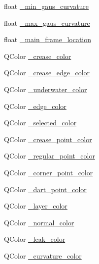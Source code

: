 \begin{DoxyCompactItemize}
\item 
float \hyperlink{classShipCAD_1_1SubdivisionSurface_ac343c30f7e4e6a5926fdfed7da3f9385}{\-\_\-min\-\_\-gaus\-\_\-curvature}
\item 
float \hyperlink{classShipCAD_1_1SubdivisionSurface_a1658374385131656d359ff373d2cb08c}{\-\_\-max\-\_\-gaus\-\_\-curvature}
\item 
float \hyperlink{classShipCAD_1_1SubdivisionSurface_a3ea08aa45ad221a1b485010ce5e8dee7}{\-\_\-main\-\_\-frame\-\_\-location}
\item 
Q\-Color \hyperlink{classShipCAD_1_1SubdivisionSurface_aaa3b772931e04f8650db2d005ae05d6a}{\-\_\-crease\-\_\-color}
\item 
Q\-Color \hyperlink{classShipCAD_1_1SubdivisionSurface_a6106aee9d086aa377d9a3a6a6291b54c}{\-\_\-crease\-\_\-edge\-\_\-color}
\item 
Q\-Color \hyperlink{classShipCAD_1_1SubdivisionSurface_a8a64eabb53fa0facaa6e59579305328b}{\-\_\-underwater\-\_\-color}
\item 
Q\-Color \hyperlink{classShipCAD_1_1SubdivisionSurface_aced3b075062f92e55b3a89729cad3fd2}{\-\_\-edge\-\_\-color}
\item 
Q\-Color \hyperlink{classShipCAD_1_1SubdivisionSurface_a3cfcbbe769216c753330f71e57a4cf4d}{\-\_\-selected\-\_\-color}
\item 
Q\-Color \hyperlink{classShipCAD_1_1SubdivisionSurface_a9602182d9a123dc267d34a2cd1b45ed7}{\-\_\-crease\-\_\-point\-\_\-color}
\item 
Q\-Color \hyperlink{classShipCAD_1_1SubdivisionSurface_afee1585e376c34aa9b3be47f3a174cdb}{\-\_\-regular\-\_\-point\-\_\-color}
\item 
Q\-Color \hyperlink{classShipCAD_1_1SubdivisionSurface_aba9fae36ed19b802707c748396c1fd63}{\-\_\-corner\-\_\-point\-\_\-color}
\item 
Q\-Color \hyperlink{classShipCAD_1_1SubdivisionSurface_a45054fd2d0065a342828bcd675e91307}{\-\_\-dart\-\_\-point\-\_\-color}
\item 
Q\-Color \hyperlink{classShipCAD_1_1SubdivisionSurface_a0833012e177dfd6cdb71174cb7baed17}{\-\_\-layer\-\_\-color}
\item 
Q\-Color \hyperlink{classShipCAD_1_1SubdivisionSurface_a62cbe24451a794c0da3660ed0f1066ca}{\-\_\-normal\-\_\-color}
\item 
Q\-Color \hyperlink{classShipCAD_1_1SubdivisionSurface_aacd1616b97a4425cc9b1051e01785596}{\-\_\-leak\-\_\-color}
\item 
Q\-Color \hyperlink{classShipCAD_1_1SubdivisionSurface_a05a83d21996abb065abe7f3109f35a73}{\-\_\-curvature\-\_\-color}

\end{DoxyCompactItemize}
